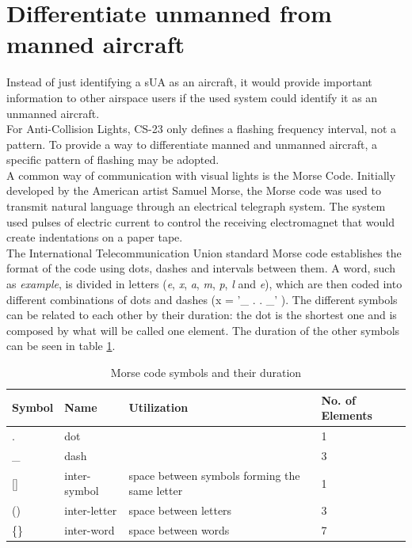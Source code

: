 \section{Differentiate unmanned from manned aircraft}
\label{section:differentiateunmanned}
Instead of just identifying a sUA as an aircraft, it would provide important information to other airspace users if the used system could identify it as an unmanned aircraft.\\
For Anti-Collision Lights, CS-23 only defines a flashing frequency interval, not a pattern. To provide a way to differentiate manned and unmanned aircraft, a specific pattern of flashing may be adopted.\\
A common way of communication with visual lights is the Morse Code. Initially developed by the American artist Samuel Morse, the Morse code was used to transmit natural language through an electrical telegraph system. The system used pulses of electric current to control the receiving electromagnet that would create indentations on a paper tape.\\
The International Telecommunication Union standard Morse code \citep{ITU2009} establishes the format of the code using dots, dashes and intervals between them. A word, such as \textit{example}, is divided in letters (\textit{e}, \textit{x}, \textit{a}, \textit{m}, \textit{p}, \textit{l} and \textit{e}), which are then coded into different combinations of dots and dashes (x = '\_ . . \_' ). The different symbols can be related to each other by their duration: the dot is the shortest one and is composed by what will be called one element. The duration of the other symbols can be seen in table \ref{tab:morsesymbols}.
\begin{table}[!htb]
\centering
\caption[Morse code symbols and their duration \citep{ITU2009}]{Morse code symbols and their duration \citep{ITU2009}}
\label{tab:morsesymbols}
\begin{tabular}{@{}llll@{}}
\toprule
Symbol & Name         & Utilization                                   & No. of Elements \\ \midrule
.      & dot          &                                               & 1               \\
\_     & dash         &                                               & 3               \\
{[}{]} & inter-symbol & space between symbols forming the same letter & 1               \\
()     & inter-letter & space between letters                         & 3               \\
\{\}   & inter-word   & space between words                           & 7               \\ \bottomrule
\end{tabular}
\end{table}

